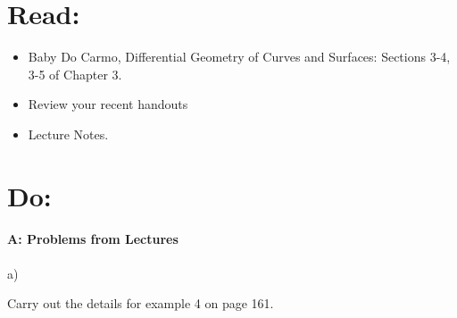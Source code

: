 \documentclass[12pt]{article}
\title{\rightline {\Huge {Due: November, 8}}}
\author{\LARGE {HMC\quad Math 142 \quad Fall 2017} 
\\ {Prof. Gu}  
\\ {\LARGE Problem Set 8}}
\date{Start this assignment before Sunday night!}
\begin{document}
\maketitle

\section*{ Read: } 

\begin{itemize}
\item{Baby Do Carmo, Differential Geometry
    of Curves and Surfaces:  
Sections 3-4, 3-5 of Chapter 3.}
\item{ Review your recent handouts}
\item{Lecture Notes.}
\end{itemize}

\section*{ Do: }

\medskip
\paragraph{A: Problems from Lectures}

\begin{itemize}
{\item a)} Carry out the details for example 4 on page 161.
\end{itemize}
\end{document}
